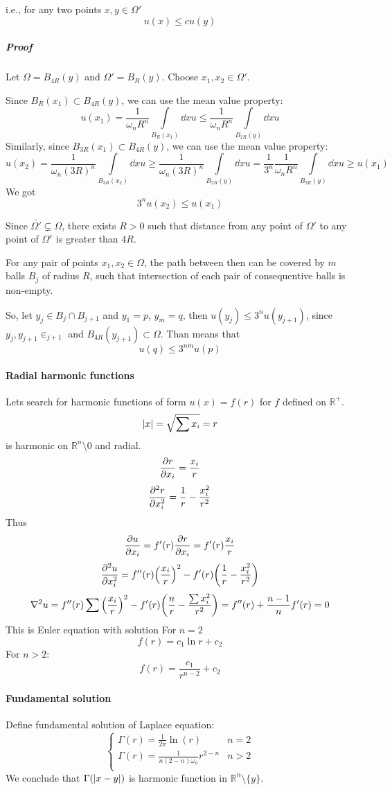 i.e., for any two points $x,y \in \Omega'$
$$u(x) \leq cu(y)$$
\subparagraph{Proof}
Let $\Omega = B_{4R}(y)$ and $\Omega' = B_{R}(y)$. Choose $x_1, x_2 \in \Omega'$.

Since $B_R(x_1) \subset B_{4R}(y)$, we can use the mean value property:
$$u(x_1) = \frac{1}{\omega_n R^n } \int\limits_{B_R(x_1)} \dd{x} u \leq \frac{1}{\omega_n R^n } \int\limits_{B_{2R}(y)} \dd{x} u$$
Similarly, since $B_{3R}(x_1) \subset B_{4R}(y)$, we can use the mean value property:
$$u(x_2) = \frac{1}{\omega_n (3R)^n } \int\limits_{B_{3R}(x_2)} \dd{x} u \geq \frac{1}{\omega_n (3R)^n } \int\limits_{B_{2R}(y)} \dd{x} u = \frac{1}{3^n} \frac{1}{\omega_n R^n } \int\limits_{B_{2R}(y)} \dd{x} u \geq u(x_1)$$
We got
$$3^nu(x_2) \leq u(x_1)$$

Since $\bar{\Omega'} \subsetneq \Omega$, there exists $R>0$ such that distance from any point of $\Omega'$ to any point of $\Omega^c$ is greater than $4R$.

For any pair of points $x_1, x_2 \in \Omega$, the path between then can be covered by $m$ balls $B_j$ of radius $R$, such that intersection of each pair of consequentive balls is non-empty.

So, let $y_j \in B_j \cap B_{j+1}$ and $y_1=p$, $y_m=q$, then $u(y_j) \leq 3^n u(y_{j+1})$, since $y_j, y_{j+1} \in _{j+1}$ and $B_{4R}(y_{j+1}) \subset \Omega$.
Than means that
$$u(q) \leq 3^{nm} u(p)$$
\paragraph{Radial harmonic functions }
Lets search for harmonic functions of form $u(x)=f(r)$ for $f$ defined on $\mathbb{R}^+$.
$$\abs{x} = \sqrt{\sum x_i} = r$$
is harmonic on $\mathbb{R}^n \setminus 0$ and radial.
$$\pdv{r}{x_i} = \frac{x_i}{r}$$
$$\pdv[2]{r}{x_i} = \frac{1}{r} - \frac{x_i^2}{r^2}$$
Thus
$$\pdv{u}{x_i} = f'(r) \pdv{r}{x_i} = f'(r) \frac{x_i}{r}$$
$$\pdv[2]{u}{x_i} = f''(r) \qty(\frac{x_i}{r})^2 - f'(r) \qty(\frac{1}{r} - \frac{x_i^2}{r^2})$$
$$\laplacian{u} = f''(r) \sum \qty(\frac{x_i}{r})^2  - f'(r) \qty(\frac{n}{r} - \frac{\sum x_i^2}{r^2}) = f''(r) + \frac{n-1}{n}f'(r) = 0$$
This is Euler equation with solution
For $n=2$
$$f(r) = c_1 \ln r + c_2$$
For $n>2$:
$$f(r) = \frac{c_1}{r^{n-2}} + c_2$$
\paragraph{Fundamental solution}
Define fundamental solution of Laplace equation:
$$
\begin{cases}
\Gamma(r) = \frac{1}{2\pi} \ln(r)&n=2\\
\Gamma(r) = \frac{1}{n(2-n)\omega_n}r^{2-n}& n>2\\
\end{cases}$$
We conclude that $\Gamma(\abs{x-y})$ is harmonic function in $\mathbb{R}^n \setminus \{y\}$.

